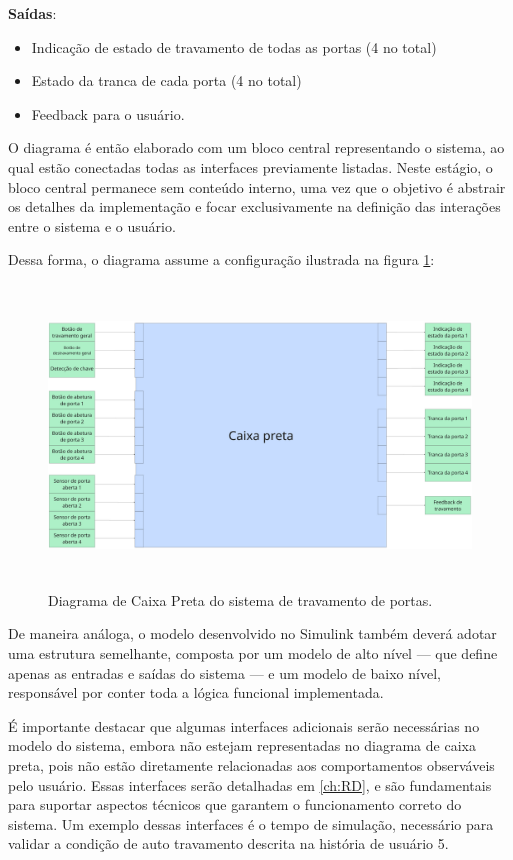 \textbf{Saídas}:

\begin{itemize}
    \item Indicação de estado de travamento de todas as portas (4 no total)
    \item Estado da tranca de cada porta (4 no total)
    \item Feedback para o usuário.
\end{itemize}

O diagrama é então elaborado com um bloco central representando o sistema, ao qual estão conectadas todas as interfaces previamente listadas. Neste estágio, 
o bloco central permanece sem conteúdo interno, uma vez que o objetivo é abstrair os detalhes da implementação e focar exclusivamente na definição das 
interações entre o sistema e o usuário.

Dessa forma, o diagrama assume a configuração ilustrada na figura \ref{fig:caixapreta}:

\begin{figure}[H]
\centering
\includegraphics[height=8cm]{figuras/diagrama_caixa_preta.png}
\caption{Diagrama de Caixa Preta do sistema de travamento de portas.}
\label{fig:caixapreta}
\end{figure}

De maneira análoga, o modelo desenvolvido no Simulink também deverá adotar uma estrutura semelhante, composta por um modelo de alto nível — que define apenas as 
entradas e saídas do sistema — e um modelo de baixo nível, responsável por conter toda a lógica funcional implementada.

É importante destacar que algumas interfaces adicionais serão necessárias no modelo do sistema, embora não estejam representadas no diagrama de caixa preta, 
pois não estão diretamente relacionadas aos comportamentos observáveis pelo usuário. Essas interfaces serão detalhadas em \ref{ch:RD}, e são fundamentais para suportar aspectos técnicos que garantem o funcionamento correto do sistema. Um exemplo dessas interfaces é o tempo 
de simulação, necessário para validar a condição de auto travamento descrita na história de usuário 5.

